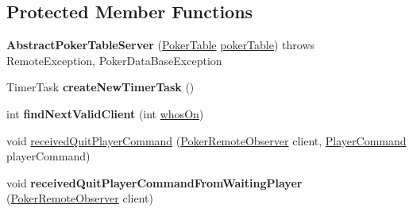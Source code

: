 \subsection*{Protected Member Functions}
\begin{DoxyCompactItemize}
\item 
\hypertarget{classhu_1_1elte_1_1bfw1p6_1_1poker_1_1server_1_1_abstract_poker_table_server_aba2ee50b82306450421114bd4d4d73e2}{}{\bfseries Abstract\+Poker\+Table\+Server} (\hyperlink{classhu_1_1elte_1_1bfw1p6_1_1poker_1_1model_1_1entity_1_1_poker_table}{Poker\+Table} \hyperlink{classhu_1_1elte_1_1bfw1p6_1_1poker_1_1server_1_1_abstract_poker_table_server_ac8a64a77bcae91e7824b32911ce76ed4}{poker\+Table})  throws Remote\+Exception, Poker\+Data\+Base\+Exception \label{classhu_1_1elte_1_1bfw1p6_1_1poker_1_1server_1_1_abstract_poker_table_server_aba2ee50b82306450421114bd4d4d73e2}

\item 
\hypertarget{classhu_1_1elte_1_1bfw1p6_1_1poker_1_1server_1_1_abstract_poker_table_server_a0cd1db5f510d1d2c87c372f338cf6f02}{}Timer\+Task {\bfseries create\+New\+Timer\+Task} ()\label{classhu_1_1elte_1_1bfw1p6_1_1poker_1_1server_1_1_abstract_poker_table_server_a0cd1db5f510d1d2c87c372f338cf6f02}

\item 
\hypertarget{classhu_1_1elte_1_1bfw1p6_1_1poker_1_1server_1_1_abstract_poker_table_server_afbc08825d954cc16b10151e563ccf45b}{}int {\bfseries find\+Next\+Valid\+Client} (int \hyperlink{classhu_1_1elte_1_1bfw1p6_1_1poker_1_1server_1_1_abstract_poker_table_server_ac4b4b5f5ec9dfa6337b54008362895a9}{whos\+On})\label{classhu_1_1elte_1_1bfw1p6_1_1poker_1_1server_1_1_abstract_poker_table_server_afbc08825d954cc16b10151e563ccf45b}

\item 
void \hyperlink{classhu_1_1elte_1_1bfw1p6_1_1poker_1_1server_1_1_abstract_poker_table_server_a55c6c613a3a5f89898d0ad8d331e3572}{received\+Quit\+Player\+Command} (\hyperlink{interfacehu_1_1elte_1_1bfw1p6_1_1poker_1_1client_1_1observer_1_1_poker_remote_observer}{Poker\+Remote\+Observer} client, \hyperlink{classhu_1_1elte_1_1bfw1p6_1_1poker_1_1command_1_1_player_command}{Player\+Command} player\+Command)
\item 
\hypertarget{classhu_1_1elte_1_1bfw1p6_1_1poker_1_1server_1_1_abstract_poker_table_server_a35feb28bf7a9dd5cf03539763d14c6fc}{}void {\bfseries received\+Quit\+Player\+Command\+From\+Waiting\+Player} (\hyperlink{interfacehu_1_1elte_1_1bfw1p6_1_1poker_1_1client_1_1observer_1_1_poker_remote_observer}{Poker\+Remote\+Observer} client)\label{classhu_1_1elte_1_1bfw1p6_1_1poker_1_1server_1_1_abstract_poker_table_server_a35feb28bf7a9dd5cf03539763d14c6fc}


\end{DoxyCompactItemize}
